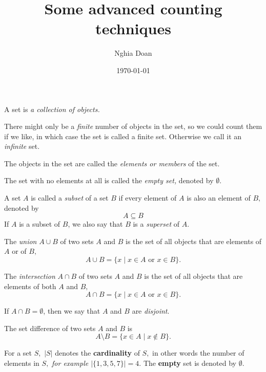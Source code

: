 \documentclass{article}
\title{Some advanced counting techniques}
\author{Nghia Doan}
\date{\today}
\begin{document}
\maketitle

\begin{definition*}[Set]
    A set is \textit{a collection of objects.}
    
    There might only be a \textit{finite} number of objects in the set, so we could count them if we like,
    in which case the set is called a finite set. Otherwise we call it an \textit{infinite} set.

    The objects in the set are called the \textit{elements or members} of the set.

    The set with no elements at all is called the \textit{empty set,} denoted by $\emptyset$. 
\end{definition*}

\begin{definition*}
    A set $A$ is called a \textit{subset} of a set $B$ if every element of $A$ is also an element of $B,$ denoted by
    \[
        A \subseteq B
    \]
    If $A$ is a subset of $B$, we also say that $B$ is a \textit{superset} of $A$.
\end{definition*}

\begin{definition*}
    The \textit{union} $A \cup B$ of two sets $A$ and $B$  is the set of all objects that are elements of $A$ or of $B,$
    \[
        A \cup B = \{x \;|\; x \in A \text{ or } x \in B\}.
    \]
   
    The \textit{intersection} $A \cap B$ of two sets $A$ and $B$ is the set of all objects that are elements of both $A$ and $B,$
    \[
        A \cap B = \{x \;|\; x \in A \text{ or } x \in B\}.
    \]
\end{definition*}

\begin{definition*}[Disjoint]
    If $A \cap B = \emptyset$, then we say that $A$ and $B$ are \textit{disjoint}. 
\end{definition*}

\begin{definition*}[Difference]
    The set difference of two sets $A$ and $B$ is 
    \[
        A \setminus B = \{x \in A \;|\; x \not\in B \}.
    \]
\end{definition*}

\begin{definition*}[Cardinality]
    For a set $S,$ $|S|$ denotes the \textbf{cardinality} of $S,$
    in other words the number of elements in $S,$
    \textit{for example $|\{1, 3, 5, 7\}| = 4.$} The \textbf{empty} set is denoted by $\emptyset.$
\end{definition*}
\end{document}
